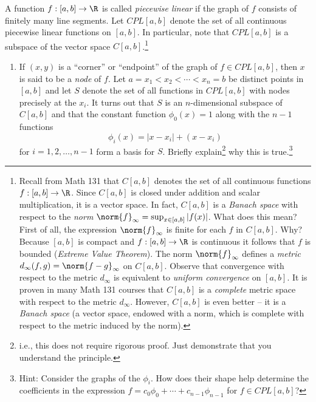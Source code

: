 \documentclass{homework}
\begin{document}
\begin{Exercise}
	A function $f:[a,b] \to \R$ is called \emph{piecewise linear} if the
  graph of $f$ consists of finitely many line segments.  Let
  $CPL[a,b]$ denote the set of all continuous piecewise linear
  functions on $[a,b]$.  In particular, note that $CPL[a,b]$ is a
  subspace of the vector space $C[a,b]$.\footnote{Recall from Math 131
    that $C[a,b]$ denotes the set of all continuous functions
    $f:[a,b]\to\R$.  Since $C[a,b]$ is closed under addition and
    scalar multiplication, it is a vector space.  In fact, $C[a,b]$ is
    a \emph{Banach space} with respect to the \emph{norm}
    $\norm{f}_{\infty} = \sup_{x\in[a,b]} |f(x)|$.  What does this
    mean?  First of all, the expression $\norm{f}_{\infty}$ is finite
    for each $f$ in $C[a,b]$.  Why?  Because $[a,b]$ is compact and
    $f:[a,b]\to\R$ is continuous it follows that $f$ is bounded
    (\emph{Extreme Value Theorem}).  The norm $\norm{f}_{\infty}$
    defines a \emph{metric} $d_{\infty}(f,g) = \norm{f-g}_{\infty}$ on
    $C[a,b]$.  Observe that convergence with respect to the metric
    $d_{\infty}$ is equivalent to \emph{uniform convergence} on
    $[a,b]$.  It is proven in many Math 131 courses that $C[a,b]$ is a
    \emph{complete} metric space with respect to the metric
    $d_{\infty}$.  However, $C[a,b]$ is even better -- it is a
    \emph{Banach space} (a vector space, endowed with a norm, which is
    complete with respect to the metric induced by the norm).}
	\begin{enumerate}
  \item If $(x,y)$ is a ``corner'' or ``endpoint'' of the graph of
    $f \in CPL[a,b]$, then $x$ is said to be a \emph{node} of $f$.
    Let $a = x_1 < x_2 < \cdots < x_n = b$ be distinct points in
    $[a,b]$ and let $S$ denote the set of all functions in $CPL[a,b]$
    with nodes precisely at the $x_i$.  It turns out that $S$ is an
    $n$-dimensional subspace of $C[a,b]$ and that the constant
    function $\phi_0(x) = 1$ along with the $n-1$ functions
    \begin{equation*}
      \phi_i(x) = | x - x_i| + (x - x_i)
    \end{equation*}
    for $i = 1,2,\ldots, n-1$ form a basis for $S$.  Briefly
    explain\footnote{i.e., this does not require rigorous proof.  Just
      demonstrate that you understand the principle.}  why this is
    true.\footnote{Hint: Consider the graphs of the $\phi_i$.  How
      does their shape help determine the coefficients in the
      expression $f = c_0 \phi_0 + \cdots + c_{n-1} \phi_{n-1}$ for
      $f \in CPL[a,b]$?}


\end{enumerate}
\end{Exercise}
\end{document}
